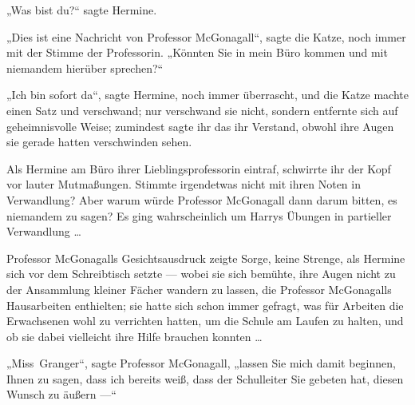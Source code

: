„Was bist du?“ sagte Hermine.

„Dies ist eine Nachricht von Professor McGonagall“, sagte die Katze, noch immer mit der Stimme der Professorin.
„Könnten Sie in mein Büro kommen und mit niemandem hierüber sprechen?“

„Ich bin sofort da“, sagte Hermine, noch immer überrascht, und die Katze machte einen Satz und verschwand; nur verschwand sie nicht, sondern entfernte sich auf geheimnisvolle Weise; zumindest sagte ihr das ihr Verstand, obwohl ihre Augen sie gerade hatten verschwinden sehen.

Als Hermine am Büro ihrer Lieblingsprofessorin eintraf, schwirrte ihr der Kopf vor lauter Mutmaßungen. Stimmte irgendetwas nicht mit ihren Noten in Verwandlung? Aber warum würde Professor McGonagall dann darum bitten, es niemandem zu sagen? Es ging wahrscheinlich um Harrys Übungen in partieller Verwandlung …

Professor McGonagalls Gesichtsausdruck zeigte Sorge, keine Strenge, als Hermine sich vor dem Schreibtisch setzte — wobei sie sich bemühte, ihre Augen nicht zu der Ansammlung kleiner Fächer wandern zu lassen, die Professor McGonagalls Hausarbeiten enthielten; sie hatte sich schon immer gefragt, was für Arbeiten die Erwachsenen wohl zu verrichten hatten, um die Schule am Laufen zu halten, und ob sie dabei vielleicht ihre Hilfe brauchen konnten …

„Miss~Granger“, sagte Professor McGonagall, „lassen Sie mich damit beginnen, Ihnen zu sagen, dass ich bereits weiß, dass der Schulleiter Sie gebeten hat, diesen Wunsch zu äußern —“

